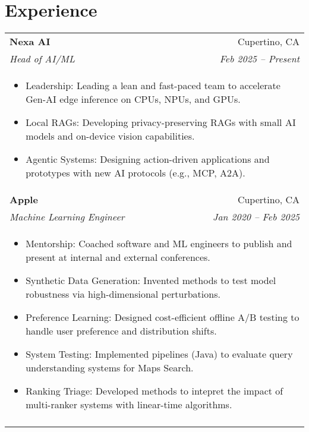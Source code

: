 \documentclass[letterpaper,11pt]{article}
\begin{document}
\section{Experience}
\begin{tabular*}{0.97\textwidth}[t]{l@{\extracolsep{\fill}}r}
  \textbf{Nexa AI} & Cupertino, CA \\
  \textit{\small Head of AI/ML} & \textit{\small Feb 2025 -- Present} \\
  \multicolumn{2}{l}{
    \begin{minipage}{\textwidth}
      \vspace{0.3em}
      \begin{itemize}[leftmargin=*, itemsep=-4.5pt, topsep=0pt, label={\raisebox{0.4ex}{\tiny\textbullet}}]
        \item  Leadership: Leading a lean and fast-paced team to accelerate Gen-AI edge inference on CPUs, NPUs, and GPUs.
        \item  Local RAGs: Developing privacy-preserving RAGs with small AI models and on-device vision capabilities.
        \item  Agentic Systems: Designing action-driven applications and prototypes with new AI protocols (e.g., MCP, A2A).
      \end{itemize}
    \end{minipage}
  } \\
  \noalign{\vspace{0.7em}}

  \textbf{Apple} & Cupertino, CA \\
  \textit{\small Machine Learning Engineer} & \textit{\small Jan 2020 -- Feb 2025} \\
  \multicolumn{2}{l}{
    \begin{minipage}{\textwidth}
      \vspace{0.3em}
      \begin{itemize}[leftmargin=*, itemsep=-4.5pt, topsep=0pt, label={\raisebox{0.4ex}{\tiny\textbullet}}]       
        \item  Mentorship: Coached software and ML engineers to publish and present at internal and external conferences.
        \item  Synthetic Data Generation: Invented methods to test model robustness via high-dimensional perturbations.
        \item  Preference Learning: Designed cost-efficient offline A/B testing to handle user preference and distribution shifts.
        \item  System Testing: Implemented pipelines (Java) to evaluate query understanding systems for Maps Search.
        \item  Ranking Triage: Developed methods to intepret the impact of multi-ranker systems with linear-time algorithms.
      \end{itemize}
    \end{minipage}
  } \\
  \noalign{\vspace{0.7em}}


\end{tabular*}
\end{document}
